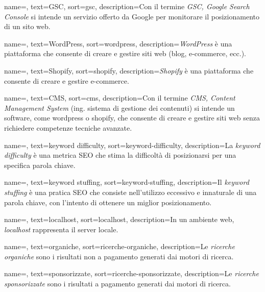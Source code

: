  {
    name=,
    text=GSC,
    sort=gsc,
    description={Con il termine \emph{GSC, Google Search Console} si intende un servizio offerto da Google per monitorare il posizionamento di un sito web.}
}

 {
    name=,
    text=WordPress,
    sort=wordpress,
    description={\emph{WordPress} è una piattaforma che consente di creare e gestire siti web (blog, e-commerce, ecc.).}
}

 {
    name=,
    text=Shopify,
    sort=shopify,
    description={\emph{Shopify} è una piattaforma che consente di creare e gestire e-commerce.}
}

 {
    name=,
    text=CMS,
    sort=cms,
    description={Con il termine \emph{CMS, Content Management System} (ing. sistema di gestione dei contenuti) si intende un software, come \gls{wordpress} o \gls{shopify}, che consente di creare e gestire siti web senza richiedere competenze tecniche avanzate.}
}

 {
    name=,
    text=keyword difficulty,
    sort=keyword-difficulty,
    description={La \emph{keyword difficulty} è una metrica SEO che stima la difficoltà di posizionarsi per una specifica parola chiave.}
}

 {
    name=,
    text=keyword stuffing,
    sort=keyword-stuffing,
    description={Il \emph{keyword stuffing} è una pratica SEO che consiste nell'utilizzo eccessivo e innaturale di una parola chiave, con l'intento di ottenere un miglior posizionamento.}
}

 {
    name=,
    text=localhost,
    sort=localhost,
    description={In un ambiente web, \emph{localhost} rappresenta il server locale.}
}

 {
    name=,
    text=organiche,
    sort=ricerche-organiche,
    description={Le \emph{ricerche organiche} sono i risultati non a pagamento generati dai motori di ricerca.}
}

 {
    name=,
    text=sponsorizzate,
    sort=ricerche-sponsorizzate,
    description={Le \emph{ricerche sponsorizzate} sono i risultati a pagamento generati dai motori di ricerca.}
}

